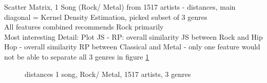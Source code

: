\noindent Scatter Matrix, 1 Song (Rock/ Metal) from 1517 artists - distances, main diagonal = Kernel Density Estimation, picked subset of 3 genres\\ All features combined recommends Rock primarily\\
Most interesting Detail: Plot JS - RP: overall similarity JS between Rock and Hip Hop - overall similarity RP between Classical and Metal - only one feature would not be able to separate all 3 genres in figure \ref{fig:corr5}
\begin{figure}[htbp]
	\centering
	\caption{distances 1 song, Rock/ Metal, 1517 artists, 3 genres}
	\label{fig:corr5}
\end{figure}
\FloatBarrier

